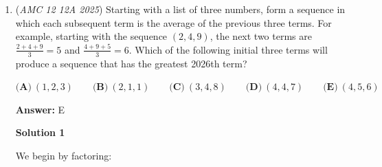 \begin{enumerate}
 



\textbf{Solution 5 (Compl. Counting)}

The total number of cases is $7*6*5=210$. Note that no number can be 1, since that would result in cases like $z>y$ and $z<y$, which is impossible.

 We can try complementary counting. Since in this problem x,y,z cases are symmetrical, we first consider cases where $xy<z$. The cases are:$(x,y,z): (2,3,6) (2,3,7) (2,3,8) (2,4,8)$. By symmetry, the cases that don't work amount to $4*6=24$ cases. Therefore the total number of cases that work is $210-24=186$, which is $\boxed{\textbf{(C)}~186}$.~backtosq-1

 



\textbf{Solution 6 (Symmetry + Complementary Counting)}

Since $\{ x,y,z \} \subset \{ 1,2,3,4,5,6,7,8 \}$, WLOG let $1\le x<y<z\le 8$ ($\times 3! =6$). Note that the lower bounds make the conditions $y<xz\le 1z$ and $x<zy<z$ trivial. In addition, $x=1$ always fails, since it would force $z<xy=y$, a contradiction. Thus, it remains exactly to check $2\le x<y<z\le 8<xy$. 

 The only failure cases with $xy\le 8$ can occur when $(x,y)=(2,3),(2,4)$, for which we have corresponding $z\in \{ 6,7,8 \},\{ 8 \}$. The total number of cases is $\binom{7}{3}=35$. Thus, the number of good cases is $35-4=31$, and after multiplying by order we get $3!\cdot 31=\boxed{\textbf{(C)}~186}$.

 


	\item (\textit{AMC 12 12A 2025}) Starting with a list of three numbers, form a sequence in which each subsequent term is the average of the previous three terms. For example, starting with the sequence $(2,4,9)$, the next two terms are $\frac{2+4+9}{3} = 5$ and $\frac{4+9+5}{3} = 6$. Which of the following initial three terms will produce a sequence that has the greatest 2026th term?


 $\textbf{(A)}\   (1,2,3)  \qquad                 \textbf{(B)}\   (2,1,1)  \qquad                 \textbf{(C)}\   (3,4,8)  \qquad                 \textbf{(D)}\   (4,4,7)  \qquad                 \textbf{(E)}\   (4,5,6)$

 \textbf{Answer: }E



\textbf{Solution 1}

We begin by factoring:


\end{enumerate}
